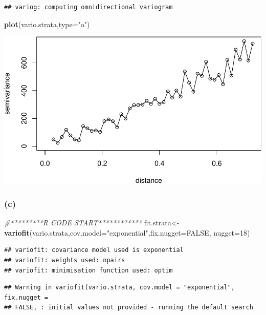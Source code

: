 \documentclass[]{article}
\newenvironment{Shaded}{\begin{snugshade}}{\end{snugshade}}
\newcommand{\KeywordTok}[1]{\textcolor[rgb]{0.13,0.29,0.53}{\textbf{#1}}}
\newcommand{\DataTypeTok}[1]{\textcolor[rgb]{0.13,0.29,0.53}{#1}}
\newcommand{\DecValTok}[1]{\textcolor[rgb]{0.00,0.00,0.81}{#1}}
\newcommand{\StringTok}[1]{\textcolor[rgb]{0.31,0.60,0.02}{#1}}
\newcommand{\CommentTok}[1]{\textcolor[rgb]{0.56,0.35,0.01}{\textit{#1}}}
\newcommand{\OtherTok}[1]{\textcolor[rgb]{0.56,0.35,0.01}{#1}}
\newcommand{\NormalTok}[1]{#1}
\begin{document}
\begin{verbatim}
## variog: computing omnidirectional variogram
\end{verbatim}

\begin{Shaded}
\begin{Highlighting}[]
\KeywordTok{plot}\NormalTok{(vario.strata,}\DataTypeTok{type=}\StringTok{"o"}\NormalTok{)}
\end{Highlighting}
\end{Shaded}

\includegraphics{homework2_files/figure-latex/ex_b-1.pdf}

\subsubsection{(c)}\label{c}

\begin{Shaded}
\begin{Highlighting}[]
\CommentTok{#*********R CODE START************}
\NormalTok{fit.strata<-}\StringTok{ }\KeywordTok{variofit}\NormalTok{(vario.strata,}\DataTypeTok{cov.model=}\StringTok{"exponential"}\NormalTok{,}\DataTypeTok{fix.nugget=}\OtherTok{FALSE}\NormalTok{, }\DataTypeTok{nugget=}\DecValTok{18}\NormalTok{)}
\end{Highlighting}
\end{Shaded}

\begin{verbatim}
## variofit: covariance model used is exponential 
## variofit: weights used: npairs 
## variofit: minimisation function used: optim
\end{verbatim}

\begin{verbatim}
## Warning in variofit(vario.strata, cov.model = "exponential", fix.nugget =
## FALSE, : initial values not provided - running the default search
\end{verbatim}
\end{document}
